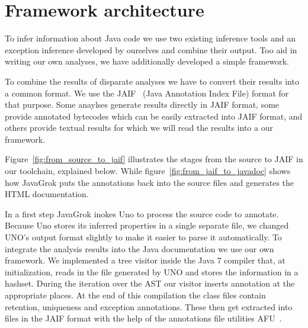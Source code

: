 \section{Framework architecture}

\begin{figure*}
\centering
{}
\caption{Toolchain from source to JAIF}
\label{fig:from_source_to_jaif}
\end{figure*}

To infer information about Java code we use two existing inference tools and 
an exception inference developed by ourselves and combine their output. 
Too aid in writing our own analyses, we have additionally developed a simple 
framework. 

To combine the results of disparate analyses we have to convert their results
into a common format.  We use the JAIF~\cite{JAIF}
(Java Annotation Index File) format for that purpose.  Some anaylses generate
results directly in JAIF format, some provide annotated bytecodes which can be
easily extracted into JAIF format, and others provide textual results for which
we will read the results into a our framework.

Figure~\ref{fig:from_source_to_jaif} 
illustrates the stages from the source to JAIF in our toolchain, explained 
below. While figure~\ref{fig:from_jaif_to_javadoc} shows how JavaGrok
puts the annotations back into the source files and generates the HTML
documentation.

\begin{figure*}
\centering
{}
\caption{From JAIF to Javadoc}
\label{fig:from_jaif_to_javadoc}
\end{figure*}

In a first step JavaGrok inokes Uno to process the source code to annotate. 
Because Uno stores its inferred properties in a single separate file, 
we changed UNO's output format slightly to make it easier to parse it automatically.
To integrate the analysis results into the Java documentation we
use our own framework. We implemented a tree visitor inside the Java 7 
compiler that, at initialization, reads in the file generated by UNO and 
stores the information in a hashset. During the iteration over the AST
our visitor inserts annotation at the appropriate places. At the end of
this compilation the class files contain retention, uniqueness and exception 
annotations. These then get extracted into files in the JAIF format with the
help of the annotations file utilities AFU~\cite{AFU}.

